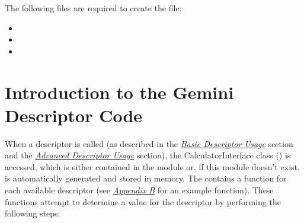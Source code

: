 \documentclass[letterpaper,10pt,english]{sphinxmanual}
\begin{document}
The following files are required to create the
 file:
\begin{itemize}
\item {} 

\item {} 

\item {} 

\end{itemize}


\section{Introduction to the Gemini Descriptor Code}
\label{coding:introduction-to-the-gemini-descriptor-code}
When a descriptor is called (as described in the {\hyperref[basicusage:basic-descriptor-usage]{\emph{Basic Descriptor Usage}}} section and the {\hyperref[advancedusage:advanced-descriptor-usage]{\emph{Advanced Descriptor Usage}}} section), the CalculatorInterface class ()
is accessed, which is either contained in the module
 or, if this module doesn't exist, is
automatically generated and stored in memory. The  contains a function
for each available descriptor (see {\hyperref[appendices/appendixB:appendix-ci]{\emph{Appendix B}}} for an
example function). These functions attempt to determine a value for the
descriptor by performing the following steps:
\end{document}
